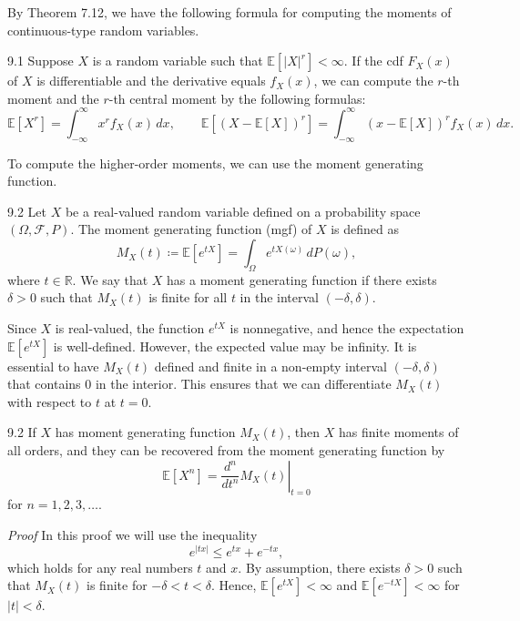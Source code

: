 By Theorem 7.12, we have the following formula for computing the moments of continuous-type random variables.

\begin{thmbox}{9.1}
Suppose $X$ is a random variable such that $\mathbb{E}[\lvert X\rvert^r] < \infty$. If the cdf $F_X(x)$ of $X$ is differentiable and the derivative equals $f_X(x)$, we can compute the $r$-th moment and the $r$-th central moment by the following formulas:
\[
\mathbb{E}[X^r] = \int_{-\infty}^{\infty} x^r f_X(x)\,dx,
\qquad
\mathbb{E}[(X-\mathbb{E}[X])^r] =
\int_{-\infty}^{\infty} (x-\mathbb{E}[X])^r f_X(x)\,dx.
\]
\end{thmbox}

To compute the higher-order moments, we can use the moment generating function.

\begin{defbox}{9.2}
Let $X$ be a real-valued random variable defined on a probability space $(\Omega,\mathcal{F},P)$. The moment generating function (mgf) of $X$ is defined as
\[
M_X(t) \coloneqq \mathbb{E}[e^{tX}] =
\int_{\Omega} e^{tX(\omega)}\,dP(\omega),
\]
where $t \in \mathbb{R}$. We say that $X$ has a moment generating function if there exists $\delta > 0$ such that $M_X(t)$ is finite for all $t$ in the interval $(-\delta,\delta)$.

Since $X$ is real-valued, the function $e^{tX}$ is nonnegative, and hence the expectation $\mathbb{E}[e^{tX}]$ is well-defined. However, the expected value may be infinity. It is essential to have $M_X(t)$ defined and finite in a non-empty interval $(-\delta,\delta)$ that contains $0$ in the interior. This ensures that we can differentiate $M_X(t)$ with respect to $t$ at $t=0$.
\end{defbox}

\begin{thmbox}{9.2}
If $X$ has moment generating function $M_X(t)$, then $X$ has finite moments of all orders, and they can be recovered from the moment generating function by
\[
\mathbb{E}[X^n] =
\left.\frac{d^n}{dt^n}M_X(t)\right|_{t=0}
\]
for $n=1,2,3,\ldots$.
\end{thmbox}

\textit{Proof}
In this proof we will use the inequality
\[
e^{\lvert tx\rvert} \leq e^{tx}+e^{-tx},
\]
which holds for any real numbers $t$ and $x$. By assumption, there exists $\delta>0$ such that $M_X(t)$ is finite for $-\delta<t<\delta$. Hence, $\mathbb{E}[e^{tX}]<\infty$ and $\mathbb{E}[e^{-tX}]<\infty$ for $\lvert t\rvert<\delta$.

